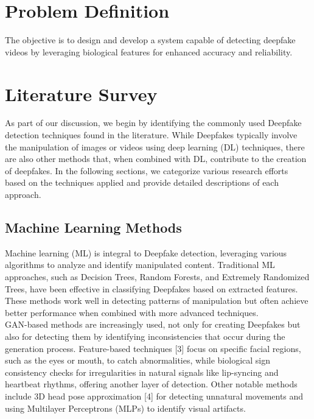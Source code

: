 \documentclass[conference]{IEEEtran}
\begin{document}
    \section{Problem Definition}
    
    The objective is to design and develop a system capable of detecting deepfake videos by leveraging biological features for enhanced accuracy and reliability.

    \section{Literature Survey}
    
        As part of our discussion, we begin by identifying the commonly used Deepfake detection techniques found in the literature. While Deepfakes typically involve the manipulation of images or videos using deep learning (DL) techniques, there are also other methods that, when combined with DL, contribute to the creation of deepfakes. In the following sections, we categorize various research efforts based on the techniques applied and provide detailed descriptions of each approach.
        
            \subsection{Machine Learning Methods}
            
            Machine learning (ML) is integral to Deepfake detection, leveraging various algorithms to analyze and identify manipulated content. Traditional ML approaches, such as Decision Trees, Random Forests, and Extremely Randomized Trees, have been effective in classifying Deepfakes based on extracted features. These methods work well in detecting patterns of manipulation but often achieve better performance when combined with more advanced techniques. \\
            
            GAN-based methods are increasingly used, not only for creating Deepfakes but also for detecting them by identifying inconsistencies that occur during the generation process. Feature-based techniques [3] focus on specific facial regions, such as the eyes or mouth, to catch abnormalities, while biological sign consistency checks for irregularities in natural signals like lip-syncing and heartbeat rhythms, offering another layer of detection. Other notable methods include 3D head pose approximation [4] for detecting unnatural movements and using Multilayer Perceptrons (MLPs) to identify visual artifacts. \\
            
\end{document}
